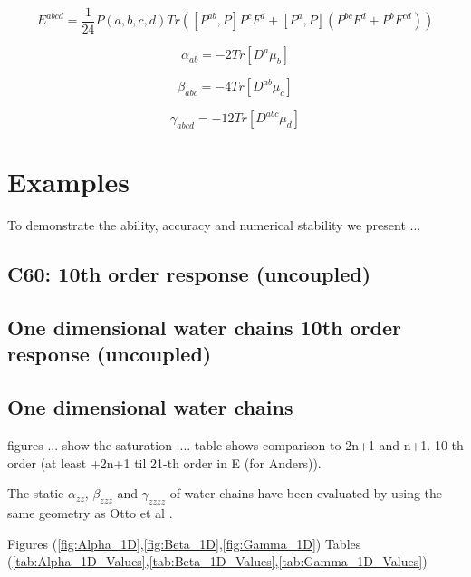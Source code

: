 \documentclass[prl,aps,twocolumn,showpacs,twocolumngrid,superbib]{revtex4}
\begin{document}
\begin{equation}
  E^{abcd}=\frac{1}{24}P(a,b,c,d)Tr([P^{ab},P] P^c F^d +[P^a,P](P^{bc} F^d + P^b F^{cd}))
\end{equation}

\begin{equation}
  \alpha_{ab}=-2Tr[D^a\mu_b]
\end{equation}

\begin{equation}
  \beta_{abc}=-4Tr[D^{ab}\mu_c]
\end{equation}

\begin{equation}
  \gamma_{abcd}=-12Tr[D^{abc}\mu_d]
\end{equation}



\section{Examples}
To demonstrate the ability, accuracy and numerical stability we present
...

\subsection{C60: 10th order response (uncoupled)}


\subsection{One dimensional water chains 10th order response (uncoupled)}

\subsection{One dimensional water chains}
figures ... show the saturation ....
table shows comparison to 2n+1 and n+1.
10-th order (at least +2n+1 til 21-th order in E (for Anders)).

The static $\alpha_{zz}$, $\beta_{zzz}$ and $\gamma_{zzzz}$ 
of water chains have been evaluated by using the same geometry as
Otto et al \cite{POtto00}.

Figures (\ref{fig:Alpha_1D},\ref{fig:Beta_1D},\ref{fig:Gamma_1D})
Tables (\ref{tab:Alpha_1D_Values},\ref{tab:Beta_1D_Values},\ref{tab:Gamma_1D_Values})
\end{document}
